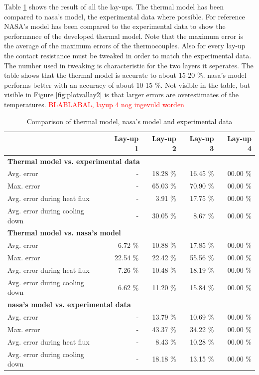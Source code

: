 Table \ref{tab:valerrorthermo} shows the result of all the lay-ups. The thermal model has been compared to \gls{nasa}'s model, the experimental data where possible. For reference NASA's model has been compared to the experimental data to show the performance of the developed thermal model. Note that the maximum error is the average of the maximum errors of the thermocouples. Also for every lay-up the contact resistance must be tweaked in order to match the experimental data. The number used in tweaking is characteristic for the two layers it seperates. The table shows that the thermal model is accurate to about 15-20 \%. \gls{nasa}'s model performs better with an accuracy of about 10-15 \%. Not visible in the table, but visible in Figure \ref{fig:plotvallay2} is that larger errors are overestimates of the temperatures. \textcolor{red}{BLABLABAL, layup 4 nog ingevuld worden}

\begin{table}[h]
	\centering
	\caption{Comparison of thermal model, \acrshort{nasa}'s model and experimental data}
	\begin{tabular}{|p{5.6cm}|rrrr|}
		\hline
		\textbf{} & \textbf{Lay-up 1} & \textbf{Lay-up 2} & \textbf{Lay-up 3} & \textbf{Lay-up 4} \\ \hline \hline
		\multicolumn{5}{|l|}{\textbf{Thermal model vs. experimental data}}			\\ \hline	
		Avg. error											&        - & 18.28 \% & 16.45 \% & 00.00 \% \\
		Max. error											&        - & 65.03 \% & 70.90 \% & 00.00 \% \\
		Avg. error during heat flux							&        - &  3.91 \% & 17.75 \% & 00.00 \% \\
		Avg. error during cooling down						&        - & 30.05 \% &  8.67 \% & 00.00 \% \\ \hline
		\multicolumn{5}{|l|}{\textbf{Thermal model vs. \gls{nasa}'s model}}			\\ \hline		
		Avg. error											&  6.72 \% & 10.88 \% & 17.85 \% & 00.00 \% \\
		Max. error											& 22.54 \% & 22.42 \% & 55.56 \% & 00.00 \% \\
		Avg. error during heat flux							&  7.26 \% & 10.48 \% & 18.19 \% & 00.00 \% \\
		Avg. error during cooling down						&  6.62 \% & 11.20 \% & 15.84 \% & 00.00 \% \\ \hline
		\multicolumn{5}{|l|}{\textbf{\gls{nasa}'s model vs. experimental data}}			\\ \hline		
		Avg. error											&        - & 13.79 \% & 10.69 \% & 00.00 \% \\
		Max. error											&        - & 43.37 \% & 34.22 \% & 00.00 \% \\
		Avg. error during heat flux							&        - &  8.43 \% & 10.28 \% & 00.00 \% \\
		Avg. error during cooling down						&        - & 18.18 \% & 13.15 \% & 00.00 \% \\ \hline
	\end{tabular}
	\label{tab:valerrorthermo}
\end{table}


